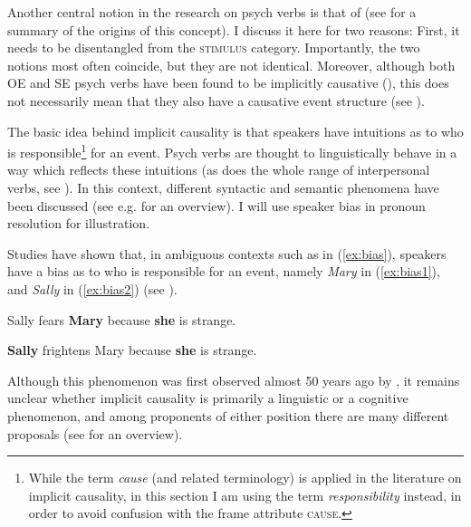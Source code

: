 Another central notion in the research on psych verbs is that of  (see \citealt[90--92]{Kailuweit.2005} for a summary of the origins of this concept). I discuss it here for two reasons: First, it needs to be disentangled from the \textsc{stimulus} category. Importantly, the two notions most often coincide, but they are not identical. Moreover, although both OE and SE psych verbs have been found to be implicitly causative (\citealt{Hartl.1999,Hartl.2001}), this does not necessarily mean that they also have a causative event structure (see ).

The basic idea behind implicit causality is that speakers have intuitions as to who is responsible\footnote{While the term \textit{cause} (and related terminology) is applied in the literature on implicit causality, in this section I am using the term \textit{responsibility} instead, in order to avoid confusion with the frame attribute \textsc{cause}.} for an event. Psych verbs are thought to linguistically behave in a way which reflects these intuitions (as does the whole range of interpersonal verbs, see \citealt{Hartl.2001}). In this context, different syntactic and semantic phenomena have been discussed (see e.g. \citealt{Hartshorne.2013,Hartshorne.2014} for an overview).
I will use speaker bias in pronoun resolution for illustration.

Studies have shown that, in ambiguous contexts such as in (\ref{ex:bias}), speakers have a bias as to who is responsible for an event, namely \textit{Mary} in (\ref{ex:bias1}), and \textit{Sally} in (\ref{ex:bias2}) (see \citealt{Hartshorne.2013,Hartshorne.2014}). 
 
\begin{exe}
	\ex \label{ex:bias}
	{\begin{xlist}
		\item \label{ex:bias1} Sally fears \textbf{Mary} because \textbf{she} is strange. 
		\item \label{ex:bias2} \textbf{Sally} frightens Mary because \textbf{she} is strange.
	\end{xlist}
	}
\end{exe}

\noindent Although this phenomenon was first observed almost 50 years ago by \citet{Garvey.1974}, it remains unclear whether implicit causality is primarily a linguistic or a cognitive phenomenon, and among proponents of either position there are many different proposals (see \citealt{Hartshorne.2014} for an overview). 

